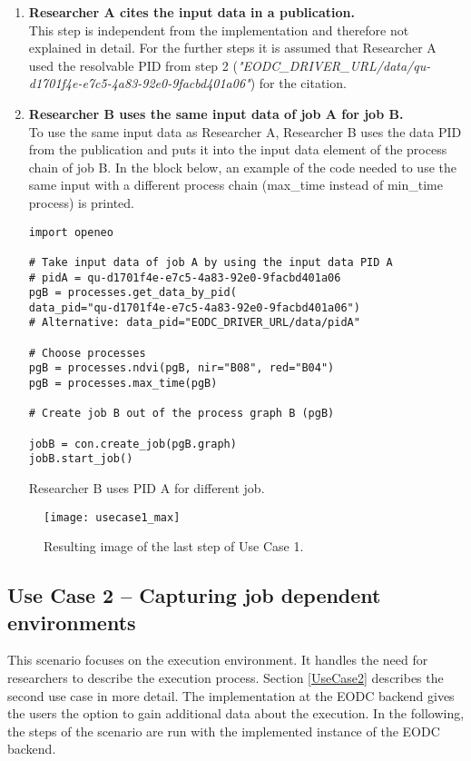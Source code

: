 \documentclass[draft,final]{vutinfth} %
\newenvironment{code}{\captionsetup{type=listing}}{}
\begin{document}
\begin{enumerate}
	\item \textbf{Researcher A cites the input data in a publication.} \\
	This step is independent from the implementation and therefore not explained in detail. For the further steps it is assumed that Researcher A used the resolvable PID from step 2 (\textit{"EODC\_DRIVER\_URL/data/qu-d1701f4e-e7c5-4a83-92e0-9facbd401a06"}) for the citation.   
	
	\item \textbf{Researcher B uses the same input data of job A for job B.} \\
	To use the same input data as Researcher A, Researcher B uses the data PID from the publication and puts it into the input data element of the process chain of job B. In the block below, an example of the code needed to use the same input with a different process chain (max\_time instead of min\_time process) is printed.  

\begin{code}
	\begin{verbatim}
import openeo

# Take input data of job A by using the input data PID A
# pidA = qu-d1701f4e-e7c5-4a83-92e0-9facbd401a06
pgB = processes.get_data_by_pid(
data_pid="qu-d1701f4e-e7c5-4a83-92e0-9facbd401a06")
# Alternative: data_pid="EODC_DRIVER_URL/data/pidA" 

# Choose processes
pgB = processes.ndvi(pgB, nir="B08", red="B04")
pgB = processes.max_time(pgB)

# Create job B out of the process graph B (pgB)

jobB = con.create_job(pgB.graph)
jobB.start_job()
	\end{verbatim}
	\caption{Researcher B uses PID A for different job.}
	\label{lst:impl_usecase1_3}
\end{code}
	
\end{enumerate}

\begin{figure}[h]
	\centering
	\texttt{[image: usecase1\_max]}
	\caption{Resulting image of the last step of Use Case 1.}
	\label{fig:impl_usecase1_max} %
\end{figure}

\subsection{Use Case 2 – Capturing job dependent environments}\label{Implementation:Use Case2}
This scenario focuses on the execution environment. It handles the need for researchers to describe the execution process. Section \ref{UseCase2} describes the second use case in more detail. The implementation at the EODC backend gives the users the option to gain additional data about the execution. In the following, the steps of the scenario are run with the implemented instance of the EODC backend. 
\end{document}

